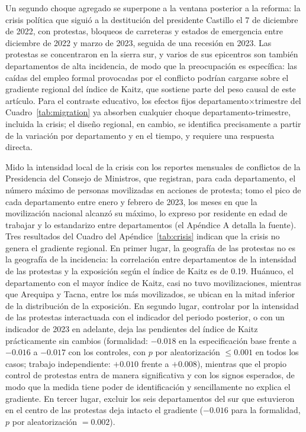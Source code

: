 Un segundo choque agregado se superpone a la ventana posterior a la reforma: la crisis política que siguió a la destitución del presidente Castillo el 7 de diciembre de 2022, con protestas, bloqueos de carreteras y estados de emergencia entre diciembre de 2022 y marzo de 2023, seguida de una recesión en 2023. Las protestas se concentraron en la sierra sur, y varios de sus epicentros son también departamentos de alta incidencia, de modo que la preocupación es específica: las caídas del empleo formal provocadas por el conflicto podrían cargarse sobre el gradiente regional del índice de Kaitz, que sostiene parte del peso causal de este artículo. Para el contraste educativo, los efectos fijos departamento$\times$trimestre del Cuadro~\ref{tab:migration} ya absorben cualquier choque departamento-trimestre, incluida la crisis; el diseño regional, en cambio, se identifica precisamente a partir de la variación por departamento y en el tiempo, y requiere una respuesta directa.

Mido la intensidad local de la crisis con los reportes mensuales de conflictos de la Presidencia del Consejo de Ministros, que registran, para cada departamento, el número máximo de personas movilizadas en acciones de protesta; tomo el pico de cada departamento entre enero y febrero de 2023, los meses en que la movilización nacional alcanzó su máximo, lo expreso por residente en edad de trabajar y lo estandarizo entre departamentos (el Apéndice A detalla la fuente). Tres resultados del Cuadro del Apéndice~\ref{tab:crisis} indican que la crisis no genera el gradiente regional. En primer lugar, la geografía de las protestas no es la geografía de la incidencia: la correlación entre departamentos de la intensidad de las protestas y la exposición según el índice de Kaitz es de 0.19. Hu\'anuco, el departamento con el mayor índice de Kaitz, casi no tuvo movilizaciones, mientras que Arequipa y Tacna, entre los más movilizados, se ubican en la mitad inferior de la distribución de la exposición. En segundo lugar, controlar por la intensidad de las protestas interactuada con el indicador del periodo posterior, o con un indicador de 2023 en adelante, deja las pendientes del índice de Kaitz prácticamente sin cambios (formalidad: $-0.018$ en la especificación base frente a $-0.016$ a $-0.017$ con los controles, con $p$ por aleatorización $\le 0.001$ en todos los casos; trabajo independiente: $+0.010$ frente a $+0.008$), mientras que el propio control de protestas entra de manera significativa y con los signos esperados, de modo que la medida tiene poder de identificación y sencillamente no explica el gradiente. En tercer lugar, excluir los seis departamentos del sur que estuvieron en el centro de las protestas deja intacto el gradiente ($-0.016$ para la formalidad, $p$ por aleatorización $= 0.002$).

